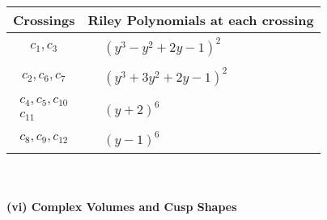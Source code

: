 \documentclass[1p]{elsarticle_modified}
\theoremstyle{definition}
\begin{document}
\begin{tabular}{m{50pt}|m{274pt}}
Crossings & \hspace{64pt}Riley Polynomials at each crossing \\
\hline $$\begin{aligned}c_{1},c_{3}\end{aligned}$$&$\begin{aligned}
&(y^3- y^2+2 y-1)^2
\end{aligned}$\\
\hline $$\begin{aligned}c_{2},c_{6},c_{7}\end{aligned}$$&$\begin{aligned}
&(y^3+3 y^2+2 y-1)^2
\end{aligned}$\\
\hline $$\begin{aligned}c_{4},c_{5},c_{10}\\c_{11}\end{aligned}$$&$\begin{aligned}
&(y+2)^6
\end{aligned}$\\
\hline $$\begin{aligned}c_{8},c_{9},c_{12}\end{aligned}$$&$\begin{aligned}
&(y-1)^6
\end{aligned}$\\
\hline
\end{tabular}\\~\\
\newpage\flushleft \textbf{(vi) Complex Volumes and Cusp Shapes}
\end{document}
